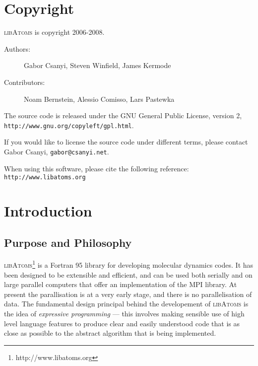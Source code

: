 
\section{Copyright}

\textsc{libAtoms} is copyright 2006-2008.

\begin{description}
\item[Authors:] Gabor Csanyi, Steven Winfield, James Kermode
\item[Contributors:] Noam Bernstein, Alessio Comisso, Lars Pastewka
\end{description}

The source code is released under the GNU General Public License,
version 2, \\ \texttt{http://www.gnu.org/copyleft/gpl.html}.

If you would like to license the source code under different terms,
please contact Gabor Csanyi, \texttt{gabor@csanyi.net}.

When using this software, please cite the following reference:
\texttt{http://www.libatoms.org}

\section{Introduction}

\subsection*{Purpose and Philosophy}

\textsc{libAtoms}\footnote{http://www.libatoms.org} is a Fortran 95
library for developing molecular dynamics codes. It has been designed
to be extensible and efficient, and can be used both serially and on
large parallel computers that offer an implementation of the MPI
library. At present the parallisation is at a very early stage, and
there is no parallelisation of data. The fundamental design principal
behind the developement of \textsc{libAtoms} is the idea of
\emph{expressive programming} --- this involves making sensible use of
high level language features to produce clear and easily understood
code that is as close as possible to the abstract algorithm that is
being implemented.

